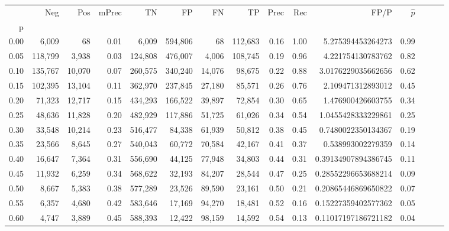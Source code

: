 \begin{tabular}{rrrrrrrrrrrrrrr}
\toprule
{} &      Neg &     Pos & mPrec &       TN &       FP &       FN &       TP &  Prec &   Rec &                   FP/P & $\hat{p}$ \\
p    &          &         &       &          &          &          &          &       &       &                        &           \\
\midrule
0.00 &    6,009 &      68 &  0.01 &    6,009 &  594,806 &       68 &  112,683 &  0.16 &  1.00 &      5.275394453264273 &      0.99 \\
0.05 &  118,799 &   3,938 &  0.03 &  124,808 &  476,007 &    4,006 &  108,745 &  0.19 &  0.96 &      4.221754130783762 &      0.82 \\
0.10 &  135,767 &  10,070 &  0.07 &  260,575 &  340,240 &   14,076 &   98,675 &  0.22 &  0.88 &     3.0176229035662656 &      0.62 \\
0.15 &  102,395 &  13,104 &  0.11 &  362,970 &  237,845 &   27,180 &   85,571 &  0.26 &  0.76 &      2.109471312893012 &      0.45 \\
0.20 &   71,323 &  12,717 &  0.15 &  434,293 &  166,522 &   39,897 &   72,854 &  0.30 &  0.65 &      1.476900426603755 &      0.34 \\
0.25 &   48,636 &  11,828 &  0.20 &  482,929 &  117,886 &   51,725 &   61,026 &  0.34 &  0.54 &     1.0455428333229861 &      0.25 \\
0.30 &   33,548 &  10,214 &  0.23 &  516,477 &   84,338 &   61,939 &   50,812 &  0.38 &  0.45 &     0.7480022350134367 &      0.19 \\
0.35 &   23,566 &   8,645 &  0.27 &  540,043 &   60,772 &   70,584 &   42,167 &  0.41 &  0.37 &      0.538993002279359 &      0.14 \\
0.40 &   16,647 &   7,364 &  0.31 &  556,690 &   44,125 &   77,948 &   34,803 &  0.44 &  0.31 &    0.39134907894386745 &      0.11 \\
0.45 &   11,932 &   6,259 &  0.34 &  568,622 &   32,193 &   84,207 &   28,544 &  0.47 &  0.25 &    0.28552296653688214 &      0.09 \\
0.50 &    8,667 &   5,383 &  0.38 &  577,289 &   23,526 &   89,590 &   23,161 &  0.50 &  0.21 &    0.20865446869650822 &      0.07 \\
0.55 &    6,357 &   4,680 &  0.42 &  583,646 &   17,169 &   94,270 &   18,481 &  0.52 &  0.16 &    0.15227359402577362 &      0.05 \\
0.60 &    4,747 &   3,889 &  0.45 &  588,393 &   12,422 &   98,159 &   14,592 &  0.54 &  0.13 &    0.11017197186721182 &      0.04 \\

\end{tabular}
